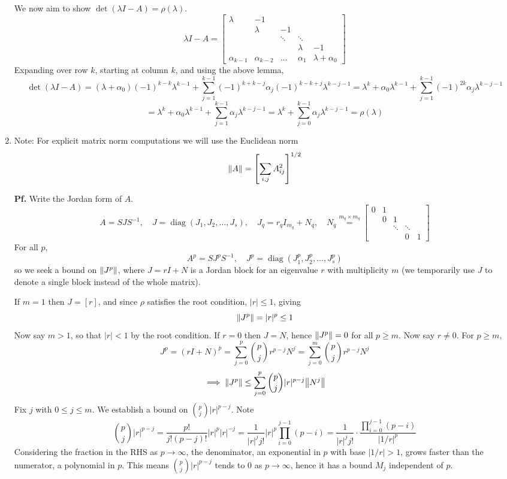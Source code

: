 \documentclass{article}
\def\tbf#1{\textbf{#1}}
\newcommand{\sbr}[1]{\left[#1\right]}
\newcommand{\m}[2][b]{\begin{#1matrix}#2\end{#1matrix}}
\newcommand{\inv}{^{-1}}
\newcommand{\pf}{\tbf{Pf. }}
\newcommand{\imp}{\implies}
\DeclareMathOperator{\diag}{diag}
\begin{document}
\begin{enumerate}
We now aim to show $\det(\lambda I-A)=\rho(\lambda)$.
$$\lambda I-A = \m{
	\lambda & -1\\
	& \lambda & -1\\
	& & \ddots & \ddots\\
	& & & \lambda & -1\\
	\alpha_{k-1} & \alpha_{k-2} & \dots & \alpha_1 & \lambda+\alpha_0
}$$
Expanding over row $k$, starting at column $k$, and using the above lemma,
$$\det(\lambda I-A)
= (\lambda+\alpha_0)(-1)^{k-k}\lambda^{k-1} + \sum_{j=1}^{k-1}(-1)^{k+k-j}\alpha_j(-1)^{k-k+j}\lambda^{k-j-1}
= \lambda^k + \alpha_0\lambda^{k-1} + \sum_{j=1}^{k-1}(-1)^{2k}\alpha_j\lambda^{k-j-1}$$
$$= \lambda^k + \alpha_0\lambda^{k-1} + \sum_{j=1}^{k-1}\alpha_j\lambda^{k-j-1}
= \lambda^k + \sum_{j=0}^{k-1}\alpha_j\lambda^{k-j-1}
= \rho(\lambda)$$



\item Note: For explicit matrix norm computations we will use the Euclidean norm
$$\norm{A} = \sbr{\sum_{i,j}A_{ij}^2}^{1/2}$$

\pf Write the Jordan form of $A$.
$$A = SJS\inv,
\quad J = \diag(J_1,J_2,\dots,J_s),
\quad J_q = r_qI_{m_q} + N_q,
\quad N_q \overset{m_q\times m_q}{=} \m{
	0 & 1 & & \\
	& 0 & 1 & & \\
	& & \ddots & \ddots \\
	& & & 0 & 1
}$$
For all $p$,
$$A^p = SJ^pS\inv,
\quad J^p = \diag(J_1^p,J_2^p,\dots,J_s^p)$$
so we seek a bound on $\norm{J^p}$, where $J=rI+N$ is a Jordan block for an eigenvalue $r$ with multiplicity $m$ (we temporarily use $J$ to denote a single block instead of the whole matrix).

If $m=1$ then $J=[r]$, and since $\rho$ satisfies the root condition, $|r|\le 1$, giving
$$\norm{J^p} = |r|^p \le 1$$
Now say $m>1$, so that $|r|<1$ by the root condition. If $r=0$ then $J=N$, hence $\norm{J^p}=0$ for all $p\ge m$. Now say $r\ne 0$. For $p\ge m$,
$$J^p = (rI+N)^p = \sum_{j=0}^p \binom{p}{j}r^{p-j}N^j = \sum_{j=0}^m \binom{p}{j}r^{p-j}N^j$$
$$\imp \norm{J^p} \le \sum_{j=0}^p \binom{p}{j}|r|^{p-j}\norm{N^j}$$
Fix $j$ with $0\le j\le m$. We establish a bound on $\binom{p}{j}|r|^{p-j}$. Note
$$\binom{p}{j}|r|^{p-j} = \frac{p!}{j!(p-j)!}|r|^p|r|^{-j}
= \frac{1}{|r|^jj!}|r|^p \prod_{i=0}^{j-1}(p-i)
= \frac{1}{|r|^jj!} \cdot \frac{\prod_{i=0}^{j-1}(p-i)}{|1/r|^p}$$
Considering the fraction in the RHS as $p\to\infty$, the denominator, an exponential in $p$ with base $|1/r|>1$, grows faster than the numerator, a polynomial in $p$. This means $\binom{p}{j}|r|^{p-j}$ tends to 0 as $p\to\infty$, hence it has a bound $M_j$ independent of $p$.


\end{enumerate}
\end{document}
